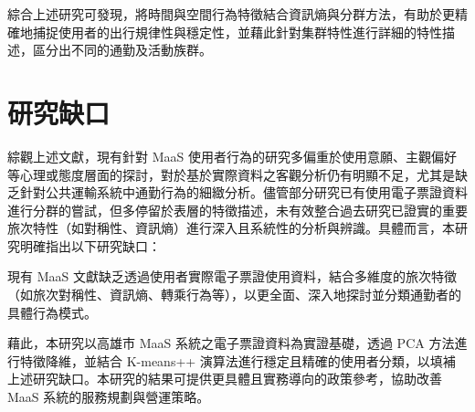 綜合上述研究可發現，將時間與空間行為特徵結合資訊熵與分群方法，有助於更精確地捕捉使用者的出行規律性與穩定性，並藉此針對集群特性進行詳細的特性描述，區分出不同的通勤及活動族群。

\section{研究缺口}\label{ux7814ux7a76ux7f3aux53e3}

綜觀上述文獻，現有針對 MaaS
使用者行為的研究多偏重於使用意願、主觀偏好等心理或態度層面的探討，對於基於實際資料之客觀分析仍有明顯不足，尤其是缺乏針對公共運輸系統中通勤行為的細緻分析。儘管部分研究已有使用電子票證資料進行分群的嘗試，但多停留於表層的特徵描述，未有效整合過去研究已證實的重要旅次特性（如對稱性、資訊熵）進行深入且系統性的分析與辨識。具體而言，本研究明確指出以下研究缺口：

現有 MaaS
文獻缺乏透過使用者實際電子票證使用資料，結合多維度的旅次特徵（如旅次對稱性、資訊熵、轉乘行為等），以更全面、深入地探討並分類通勤者的具體行為模式。

藉此，本研究以高雄市 MaaS 系統之電子票證資料為實證基礎，透過 PCA
方法進行特徵降維，並結合 K-means++
演算法進行穩定且精確的使用者分類，以填補上述研究缺口。本研究的結果可提供更具體且實務導向的政策參考，協助改善
MaaS 系統的服務規劃與營運策略。

